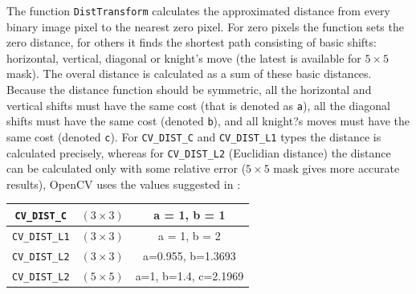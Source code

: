 \begin{description}
\end{description}

The function \texttt{DistTransform} calculates the approximated
distance from every binary image pixel to the nearest zero pixel.
For zero pixels the function sets the zero distance, for others it
finds the shortest path consisting of basic shifts: horizontal,
vertical, diagonal or knight's move (the latest is available for
$5\times 5$ mask). The overal distance is calculated as a sum of these
basic distances. Because the distance function should be symmetric,
all the horizontal and vertical shifts must have the same cost (that
is denoted as \texttt{a}), all the diagonal shifts must have the
same cost (denoted \texttt{b}), and all knight?s moves must have
the same cost (denoted \texttt{c}). For \texttt{CV\_DIST\_C} and
\texttt{CV\_DIST\_L1} types the distance is calculated precisely,
whereas for \texttt{CV\_DIST\_L2} (Euclidian distance) the distance
can be calculated only with some relative error ($5\times 5$ mask
gives more accurate results), OpenCV uses the values suggested in
\cite{Borgefors86}:


\begin{tabular}{| c | c | c |}
\hline
\texttt{CV\_DIST\_C}  & $(3\times 3)$ & a = 1, b = 1\\ \hline
\texttt{CV\_DIST\_L1} & $(3\times 3)$ & a = 1, b = 2\\ \hline
\texttt{CV\_DIST\_L2} & $(3\times 3)$ & a=0.955, b=1.3693\\ \hline
\texttt{CV\_DIST\_L2} & $(5\times 5)$ & a=1, b=1.4, c=2.1969\\ \hline
\end{tabular}

